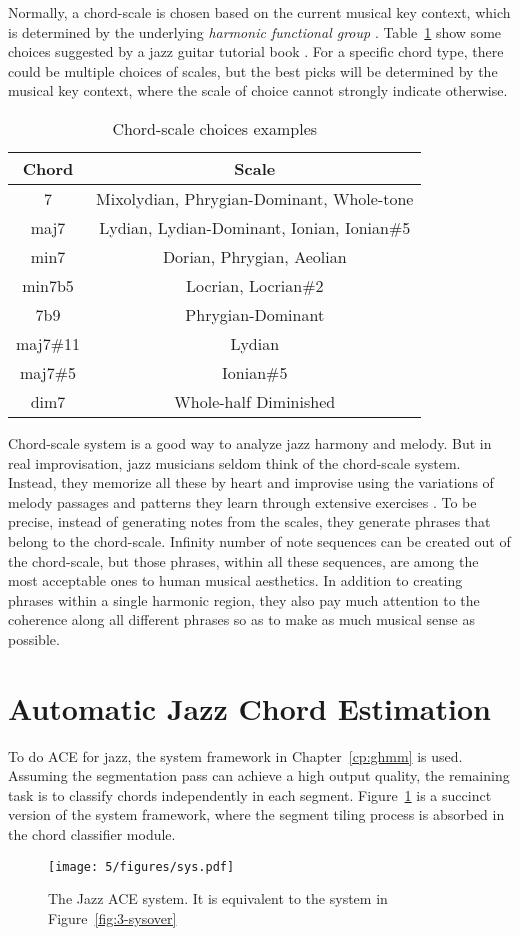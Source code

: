 Normally, a chord-scale is chosen based on the current musical key context, which is determined by the underlying {\it harmonic functional group} \cite{hojnackijazz,levine2011jazztheory}. Table~\ref{tab:5-chordscale} show some choices suggested by a jazz guitar tutorial book \cite{jazzguitarbook}. For a specific chord type, there could be multiple choices of scales, but the best picks will be determined by the musical key context, where the scale of choice cannot strongly indicate otherwise.
\begin{table}
\centering
\footnotesize
\begin{tabular}{|c|c|} \hline
Chord & Scale \\ \hline
7 & Mixolydian, Phrygian-Dominant, Whole-tone \\ \hline
maj7 & Lydian, Lydian-Dominant, Ionian, Ionian\#5 \\ \hline
min7 & Dorian, Phrygian, Aeolian \\ \hline
min7b5 & Locrian, Locrian\#2 \\ \hline
7b9 & Phrygian-Dominant \\ \hline
maj7\#11 & Lydian \\ \hline
maj7\#5 & Ionian\#5 \\ \hline
dim7 & Whole-half Diminished \\ \hline
\end{tabular}
\caption{Chord-scale choices examples}
\label{tab:5-chordscale}
\end{table}

Chord-scale system is a good way to analyze jazz harmony and melody. But in real improvisation, jazz musicians seldom think of the chord-scale system. Instead, they memorize all these by heart and improvise using the variations of melody passages and patterns they learn through extensive exercises \cite{jazzguitarimpro}. To be precise, instead of generating notes from the scales, they generate phrases that belong to the chord-scale. Infinity number of note sequences can be created out of the chord-scale, but those phrases, within all these sequences, are among the most acceptable ones to human musical aesthetics. In addition to creating phrases within a single harmonic region, they also pay much attention to the coherence along all different phrases so as to make as much musical sense as possible.

\section{Automatic Jazz Chord Estimation} \label{sec:5-jazzace}
To do ACE for jazz, the system framework in Chapter~\ref{cp:ghmm} is used. Assuming the segmentation pass can achieve a high output quality, the remaining task is to classify chords independently in each segment. Figure~\ref{fig:5-jazzsys} is a succinct version of the system framework, where the segment tiling process is absorbed in the chord classifier module.
\begin{figure}[htb]
    \centering
        \texttt{[image: 5/figures/sys.pdf]}
    \caption{The Jazz ACE system. It is equivalent to the system in Figure~\ref{fig:3-sysover}}
    \label{fig:5-jazzsys}
\end{figure}

